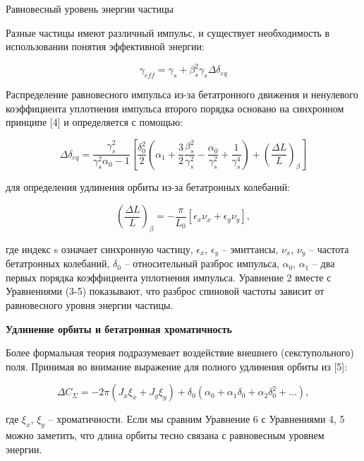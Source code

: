 \par Равновесный уровень энергии частицы

\par Разные частицы имеют различный импульс, и существует необходимость в использовании понятия эффективной энергии:

\begin{equation}
\gamma_{eff}=\gamma_s+\beta_s^2\gamma_s\Delta\delta_{eq}
\end{equation}

\par Распределение равновесного импульса из-за бетатронного движения и ненулевого коэффициента уплотнения импульса второго порядка основано на синхронном принципе [4] и определяется с помощью:

\begin{equation}
\Delta\delta_{eq}=\frac{\gamma_s^2}{\gamma_s^2\alpha_0-1}\left[\frac{\delta_0^2}{2}\left(\alpha_1+\frac{3}{2}\frac{\beta_s^2}{\gamma_s^2}-\frac{\alpha_0}{\gamma_s^2}+\frac{1}{\gamma_s^4}\right)+\left(\frac{\Delta L}{L}\right)_\beta\right]
\end{equation}

для определения удлинения орбиты из-за бетатронных колебаний:

\begin{equation}
\left(\frac{\Delta L}{L}\right)_\beta=-\frac{\pi}{L_0}\left[\epsilon_x\nu_x+\epsilon_y\nu_y\right],
\end{equation}

где индекс s означает синхронную частицу, $\epsilon_x$, $\epsilon_y$ – эмиттансы, $\nu_x$, $\nu_y$ – частота бетатронных колебаний, $\delta_0$ – относительный разброс импульса, $\alpha_0$, $\alpha_1$ – два первых порядка коэффициента уплотнения импульса. Уравнение 2 вместе с Уравнениями (3-5) показывают, что разброс спиновой частоты зависит от равновесного уровня энергии частицы.

\textbf{Удлинение орбиты и бетатронная хроматичность}

Более формальная теория подразумевает воздействие внешнего (секступольного) поля. Принимая во внимание выражение для полного удлинения орбиты из [5]:

\begin{equation}
\Delta C_\Sigma=-2\pi\left(J_x\xi_x+J_y\xi_y\right)+\delta_0\left(\alpha_0+\alpha_1\delta_0+\alpha_2\delta_0^2+\ldots\right),
\end{equation}

где $\xi_x$, $\xi_y$ – хроматичности. Если мы сравним Уравнение 6 с Уравнениями 4, 5 можно заметить, что длина орбиты тесно связана с равновесным уровнем энергии.

